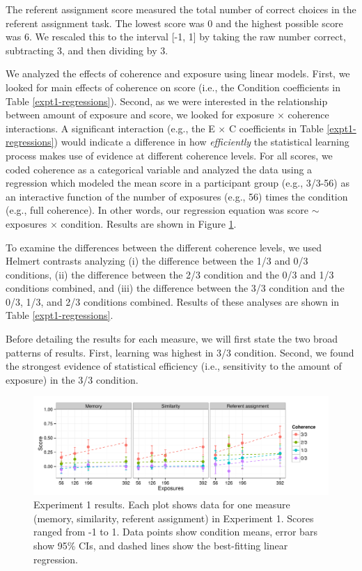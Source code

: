\documentclass[man,floatsintext]{apa6}
\begin{document}
The referent assignment score measured the total number of correct choices in the referent assignment task. The lowest score was 0 and the highest possible score was 6. We rescaled this to the interval [-1, 1] by taking the raw number correct, subtracting 3, and then dividing by 3.

We analyzed the effects of coherence and exposure using linear models. First, we looked for main effects of coherence on score (i.e., the Condition coefficients in Table \ref{expt1-regressions}). Second, as we were interested in the relationship between amount of exposure and score, we looked for exposure $\times$ coherence interactions. A significant interaction (e.g., the E $\times$ C coefficients in Table \ref{expt1-regressions}) would indicate a difference in how \emph{efficiently} the statistical learning process makes use of evidence at different coherence levels. For all scores, we coded coherence as a categorical variable and analyzed the data using a regression which modeled the mean score in a participant group (e.g., 3/3-56) as an interactive function of the number of exposures (e.g., 56) times the condition (e.g., full coherence). In other words, our regression equation was score $\sim$ exposures $\times$ condition. Results are shown in Figure \ref{expt1-results}.

To examine the differences between the different coherence levels, we used Helmert contrasts analyzing (i) the difference between the 1/3 and 0/3 conditions, (ii) the difference between the 2/3 condition and the 0/3 and 1/3 conditions combined, and (iii) the difference between the 3/3 condition and the 0/3, 1/3, and 2/3 conditions combined. Results of these analyses are shown in Table \ref{expt1-regressions}.

Before detailing the results for each measure, we will first state the two broad patterns of results. First, learning was highest in 3/3 condition. Second, we found the strongest evidence of statistical efficiency (i.e., sensitivity to the amount of exposure) in the 3/3 condition.

\begin{figure}[t]
  \begin{center}
    \includegraphics[width=1.0\linewidth]{x1}
    \caption{Experiment 1 results. Each plot shows data for one measure (memory, similarity, referent assignment) in Experiment 1. Scores ranged from -1 to 1. Data points show condition means, error bars show 95\% CIs, and dashed lines show the best-fitting linear regression.}
    \label{expt1-results}
  \end{center}
\end{figure}
\end{document}

